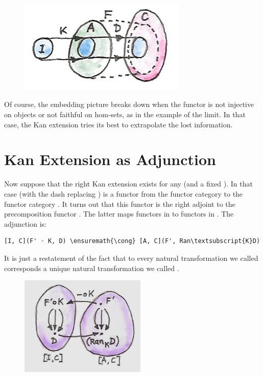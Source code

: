 \begin{figure}[H]
\centering
\includegraphics[width=80mm]{images/kan6.jpg}
\end{figure}

\noindent
Of course, the embedding picture breaks down when the functor 
is not injective on objects or not faithful on hom-sets, as in the
example of the limit. In that case, the Kan extension tries its best to
extrapolate the lost information.

\section{Kan Extension as
Adjunction}\label{kan-extension-as-adjunction}

Now suppose that the right Kan extension exists for any  (and
a fixed ). In that case  (with the dash
replacing ) is a functor from the functor category
\code{{[}I, C{]}} to the functor category \code{{[}A, C{]}}. It
turns out that this functor is the right adjoint to the precomposition
functor . The latter maps functors in \code{{[}A, C{]}}
to functors in \code{{[}I, C{]}}. The adjunction is:

\begin{Verbatim}[commandchars=\\\{\}]
[I, C](F' ◦ K, D) \ensuremath{\cong} [A, C](F', Ran\textsubscript{K}D)
\end{Verbatim}
It is just a restatement of the fact that to every natural
transformation we called  corresponds a unique natural
transformation we called .

\begin{figure}[H]
\centering
\includegraphics[width=60mm]{images/kan92.jpg}
\end{figure}

